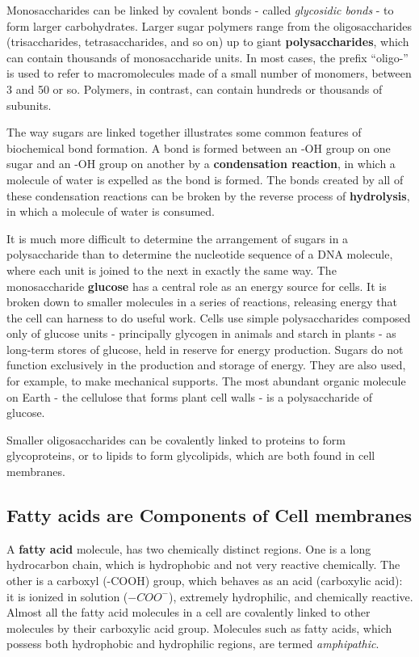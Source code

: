 Monosaccharides can be linked by covalent bonds - called \textit{glycosidic
bonds} - to form larger carbohydrates.
Larger sugar polymers range from the oligosaccharides (trisaccharides, tetrasaccharides, and so on) up to giant
\textbf{polysaccharides}, which can contain thousands of monosaccharide units.
In most cases, the prefix “oligo-” is used to refer to macromolecules made
of a small number of monomers, between 3 and 50 or so. Polymers, in
contrast, can contain hundreds or thousands of subunits.

The way sugars are linked together illustrates some common features of
biochemical bond formation. A bond is formed between an -OH group
on one sugar and an -OH group on another by a \textbf{condensation reaction},
in which a molecule of water is expelled as the bond is formed.
The bonds created by all of these condensation reactions can
be broken by the reverse process of \textbf{hydrolysis}, in which a molecule of
water is consumed.

It is much more
difficult to determine the arrangement of sugars in a polysaccharide than
to determine the nucleotide sequence of a DNA molecule, where each
unit is joined to the next in exactly the same way.
The monosaccharide \textbf{glucose} has a central role as an energy source for
cells. It is broken down to smaller molecules in a series of reactions,
releasing energy that the cell can harness to do useful work.
Cells use simple polysaccharides composed only
of glucose units - principally glycogen in animals and starch in plants - as
long-term stores of glucose, held in reserve for energy production.
Sugars do not function exclusively in the production and storage of
energy. They are also used, for example, to make mechanical supports.
The most abundant organic molecule on Earth - the cellulose that forms
plant cell walls - is a polysaccharide of glucose.

Smaller oligosaccharides can be covalently linked to proteins to form
glycoproteins, or to lipids to form glycolipids,
which are both found in cell membranes.

\subsection{Fatty acids are Components of Cell membranes}

A \textbf{fatty acid} molecule, has two
chemically distinct regions. One is a long hydrocarbon chain, which is
hydrophobic and not very reactive chemically. The other is a carboxyl
(-COOH) group, which behaves as an acid (carboxylic acid): it is ionized
in solution ($-COO^{-}$), extremely hydrophilic, and chemically reactive.
Almost all the fatty acid molecules in a cell are covalently linked to other
molecules by their carboxylic acid group.
Molecules such as fatty acids, which possess both hydrophobic and
hydrophilic regions, are termed \textit{amphipathic}.

